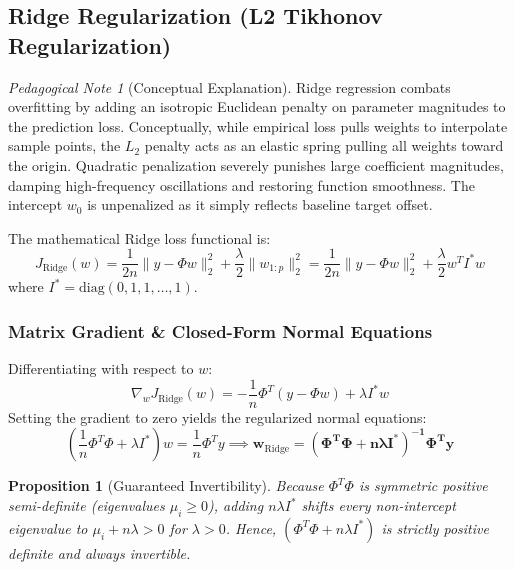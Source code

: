 \documentclass[11pt,a4paper]{article}
\theoremstyle{definition}
\theoremstyle{plain}
\newtheorem{proposition}[theorem]{Proposition}
\theoremstyle{remark}
\newtheorem*{pedagogynote}{Pedagogical Note}
\begin{document}
\subsection{Ridge Regularization (L2 Tikhonov Regularization)}
\begin{pedagogynote}[Conceptual Explanation]
Ridge regression combats overfitting by adding an isotropic Euclidean penalty on parameter magnitudes to the prediction loss. Conceptually, while empirical loss pulls weights to interpolate sample points, the $L_2$ penalty acts as an elastic spring pulling all weights toward the origin. Quadratic penalization severely punishes large coefficient magnitudes, damping high-frequency oscillations and restoring function smoothness. The intercept $w_0$ is unpenalized as it simply reflects baseline target offset.
\end{pedagogynote}

The mathematical Ridge loss functional is:
\begin{equation}
J_{\mathrm{Ridge}}(w) = \frac{1}{2n} \|y - \Phi w\|_2^2 + \frac{\lambda}{2} \|w_{1:p}\|_2^2 = \frac{1}{2n} \|y - \Phi w\|_2^2 + \frac{\lambda}{2} w^T I^* w
\end{equation}
where $I^* = \mathrm{diag}(0, 1, 1, \dots, 1)$.

\subsubsection{Matrix Gradient \& Closed-Form Normal Equations}
Differentiating with respect to $w$:
\begin{equation}
\nabla_w J_{\mathrm{Ridge}}(w) = -\frac{1}{n} \Phi^T (y - \Phi w) + \lambda I^* w
\end{equation}
Setting the gradient to zero yields the regularized normal equations:
\begin{equation}
\left( \frac{1}{n}\Phi^T \Phi + \lambda I^* \right) w = \frac{1}{n}\Phi^T y \implies \mathbf{w_{\mathrm{Ridge}} = (\Phi^T \Phi + n\lambda I^*)^{-1} \Phi^T y}
\end{equation}

\begin{proposition}[Guaranteed Invertibility]
Because $\Phi^T \Phi$ is symmetric positive semi-definite (eigenvalues $\mu_i \ge 0$), adding $n\lambda I^*$ shifts every non-intercept eigenvalue to $\mu_i + n\lambda > 0$ for $\lambda > 0$. Hence, $(\Phi^T \Phi + n\lambda I^*)$ is strictly positive definite and always invertible.
\end{proposition}
\end{document}
